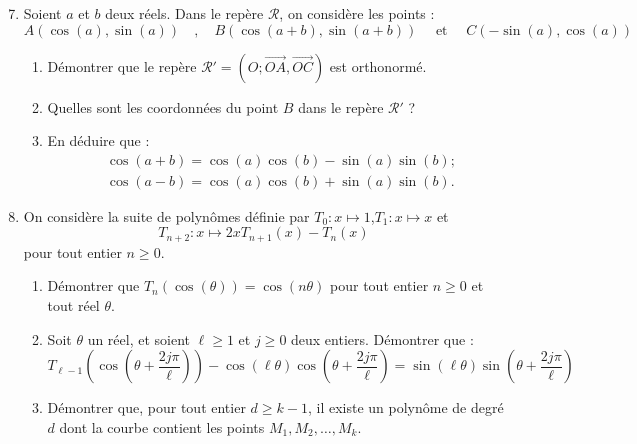 \documentclass[landscape,twocolumn,leqno,a4paper,10pt]{report} %
\renewcommand{\geq}{\geqslant}
\begin{document}
\begin{enumerate}\setcounter{enumi}{6}
	\item Soient $a$ et $b$ deux réels. Dans le repère $\mathscr{R}$, on considère les points :
	$$A(\cos (a), \sin (a)) \quad,\quad B(\cos (a+b), \sin (a+b)) \quad\text { et }\quad C(-\sin (a), \cos (a))$$
	\begin{enumerate}
		\item Démontrer que le repère $\mathscr{R}'=(O ; \overrightarrow{O A}, \overrightarrow{O C})$ est orthonormé.
		\item Quelles sont les coordonnées du point $B$ dans le repère $\mathscr{R}'$ ?
		\item En déduire que :
		$$\begin{aligned}
& \cos (a+b)=\cos (a) \cos (b)-\sin (a) \sin (b) ; \\
& \cos (a-b)=\cos (a) \cos (b)+\sin (a) \sin (b) .
\end{aligned}$$
	\end{enumerate}
	\item On considère la suite de polynômes définie par \quad $T_{0}: x \mapsto 1$,\quad $T_{1}: x \mapsto x$ \quad et 
	$$T_{n+2}: x \mapsto 2 x T_{n+1}(x)-T_{n}(x)$$
	pour tout entier $n \geq 0$.
	\begin{enumerate}
		\item Démontrer que $T_{n}(\cos (\theta))=\cos (n \theta)$ pour tout entier $n \geq 0$ et tout réel $\theta$.
		\item Soit $\theta$ un réel, et soient $\ell \geq 1$ et $j \geq 0$ deux entiers. Démontrer que :
		$$T_{\ell-1}\left(\cos \left(\theta+\frac{2 j \pi}{\ell}\right)\right)-\cos (\ell \theta) \cos \left(\theta+\frac{2 j \pi}{\ell}\right)=\sin (\ell \theta) \sin \left(\theta+\frac{2 j \pi}{\ell}\right)$$
		\item Démontrer que, pour tout entier $d \geq k-1$, il existe un polynôme de degré $d$ dont la courbe contient les points $M_{1}, M_{2}, \ldots, M_{k}$.
	\end{enumerate}
\end{enumerate}
\end{document}

